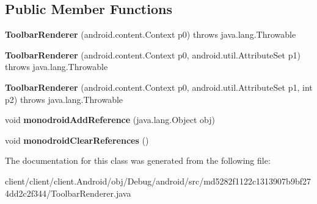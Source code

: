 \subsection*{Public Member Functions}
\begin{DoxyCompactItemize}
\item 
\hypertarget{classmd5282f1122c1313907b9bf274dd2c2f344_1_1ToolbarRenderer_a991e92b7c800c21593f88de06e042eae}{}{\bfseries Toolbar\+Renderer} (android.\+content.\+Context p0)  throws java.\+lang.\+Throwable 	\label{classmd5282f1122c1313907b9bf274dd2c2f344_1_1ToolbarRenderer_a991e92b7c800c21593f88de06e042eae}

\item 
\hypertarget{classmd5282f1122c1313907b9bf274dd2c2f344_1_1ToolbarRenderer_a9ccf40168d18dcd660969f64bef85dd1}{}{\bfseries Toolbar\+Renderer} (android.\+content.\+Context p0, android.\+util.\+Attribute\+Set p1)  throws java.\+lang.\+Throwable 	\label{classmd5282f1122c1313907b9bf274dd2c2f344_1_1ToolbarRenderer_a9ccf40168d18dcd660969f64bef85dd1}

\item 
\hypertarget{classmd5282f1122c1313907b9bf274dd2c2f344_1_1ToolbarRenderer_aadcca2ec6a6122a5a117ad9817a5525f}{}{\bfseries Toolbar\+Renderer} (android.\+content.\+Context p0, android.\+util.\+Attribute\+Set p1, int p2)  throws java.\+lang.\+Throwable 	\label{classmd5282f1122c1313907b9bf274dd2c2f344_1_1ToolbarRenderer_aadcca2ec6a6122a5a117ad9817a5525f}

\item 
\hypertarget{classmd5282f1122c1313907b9bf274dd2c2f344_1_1ToolbarRenderer_a6ba817bf1307adbe8e25d3a7fd31dfd2}{}void {\bfseries monodroid\+Add\+Reference} (java.\+lang.\+Object obj)\label{classmd5282f1122c1313907b9bf274dd2c2f344_1_1ToolbarRenderer_a6ba817bf1307adbe8e25d3a7fd31dfd2}

\item 
\hypertarget{classmd5282f1122c1313907b9bf274dd2c2f344_1_1ToolbarRenderer_afaff4f009e738419153e8eef5c353406}{}void {\bfseries monodroid\+Clear\+References} ()\label{classmd5282f1122c1313907b9bf274dd2c2f344_1_1ToolbarRenderer_afaff4f009e738419153e8eef5c353406}

\end{DoxyCompactItemize}


The documentation for this class was generated from the following file\+:\begin{DoxyCompactItemize}
\item 
client/client/client.\+Android/obj/\+Debug/android/src/md5282f1122c1313907b9bf274dd2c2f344/Toolbar\+Renderer.\+java\end{DoxyCompactItemize}
